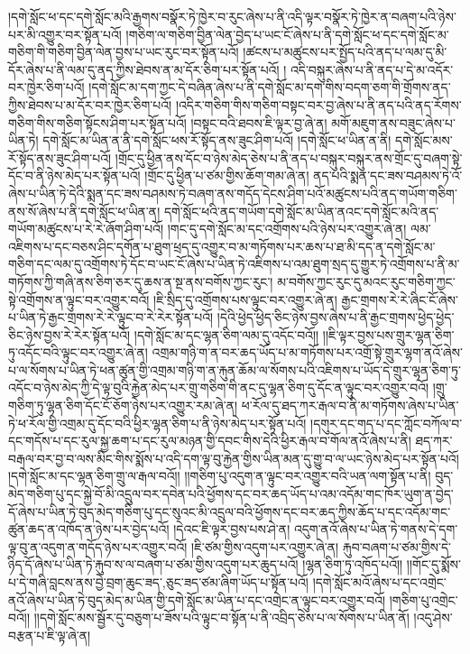 །དགེ་སློང་ཕ་དང་དགེ་སློང་མའི་རྒྱགས་བསྣོར་ཏེ་ཁྱེར་བ་རུང་ཞེས་པ་ནི་འདི་ལྟར་བསྣོར་ཏེ་ཁྱེར་ན་བཞག་པའི་ཉེས་པར་མི་འགྱུར་བར་སྟོན་པའོ། །གཅིག་ལ་གཅིག་བྱིན་ལེན་བྱེད་པ་ཡང་ངོ་ཞེས་པ་ནི་དགེ་སློང་ཕ་དང་དགེ་སློང་མ་གཅིག་གི་གཅིག་བྱིན་ལེན་བྱས་པ་ཡང་རུང་བར་སྟོན་པའོ། །ཚངས་པ་མཚུངས་པར་སྤྱོད་པའི་ནད་པ་ལམ་དུ་མི་དོར་ཞེས་པ་ནི་ལམ་དུ་ནད་ཀྱིས་ཐེབས་ན་མ་དོར་ཅིག་པར་སྟོན་པའོ། །
འདི་བསྐུར་ཞེས་པ་ནི་ནད་པ་དེ་མ་འདོར་བར་ཁྱེར་ཅིག་པའོ། །དགེ་སློང་མ་དག་ཀྱང་དེ་བཞིན་ཞེས་པ་ནི་དགེ་སློང་མ་དག་གིས་བདག་ཅག་གི་གྲོགས་ནད་ཀྱིས་ཐེབས་པ་མ་དོར་བར་ཁྱེར་ཅིག་པའོ། །འདིར་གཅིག་གིས་གཅིག་བསྟང་བར་བྱ་ཞེས་པ་ནི་ནད་པའི་ནད་རོགས་གཅིག་གིས་གཅིག་སྟོངས་ཤིག་པར་སྟོན་པའོ། །བསྟང་བའི་ཐབས་ཇི་ལྟར་བྱ་ཞེ་ན། མགོ་མཇུག་ནས་བཟུང་ཞེས་པ་ཡིན་ཏེ། དགེ་སློང་མ་ཡིན་ན་ནི་དགེ་སློང་ཕས་རོ་སྟོད་ནས་ཟུང་ཤིག་པའོ། །དགེ་སློང་ཕ་ཡིན་ན་ནི། དགེ་སློང་མས་རོ་སྟོད་ནས་ཟུང་ཤིག་པའོ། །གྲོང་དུ་ཕྱིན་ནས་དོང་བ་ཉེས་མེད་ཅེས་པ་ནི་ནད་པ་བསྐུར་བསྐུར་ནས་གྲོང་དུ་བཞག་སྟེ་དོང་བ་ནི་ཉེས་མེད་པར་སྟོན་པའོ། །གྲོང་དུ་ཕྱིན་པ་ཙམ་གྱིས་ཆོག་གམ་ཞེ་ན། ནད་པའི་སྨན་དང་ཟས་བཤམས་ཏེ་འོ་ཞེས་པ་ཡིན་ཏེ་དེའི་སྨན་དང་ཟས་བཤམས་ཏེ་བཞག་ནས་གདོད་དེངས་ཤིག་པའོ་མཚུངས་པའི་ནད་གཡོག་གཅིག་ནས་སོ་ཞེས་པ་ནི་དགེ་སློང་ཕ་ཡིན་ན། དགེ་སློང་ཕའི་ནད་གཡོག་དགེ་སློང་མ་ཡིན་ནའང་དགེ་སློང་མའི་ནད་གཡོག་མཚུངས་པ་རེ་རེ་ཞོག་ཤིག་པའོ། །གང་དུ་དགེ་སློང་མ་དང་འགྲོགས་པའི་ཉེས་པར་འགྱུར་ཞེ་ན། ལམ་འཇིགས་པ་དང་བཅས་ཤིང་དགོན་པ་ཐུག་ཕྲད་དུ་འགྱུར་བ་མ་གཏོགས་པར་ཆས་པ་ཐ་མི་དད་ན་དགེ་སློང་མ་གཅིག་དང་ལམ་དུ་འགྲོགས་ཏེ་དོང་བ་ཡང་ངོ་ཞེས་པ་ཡིན་ཏེ་འཇིགས་པ་འམ་ཐུག་སྲད་དུ་གྱུར་ཏེ་འགྲོགས་པ་ནི་མ་གཏོགས་ཀྱི་གཞི་ནས་ཅིག་ཅར་དུ་ཆས་ན་སྔ་ནས་བགོས་ཀྱང་རུང་། མ་བགོས་ཀྱང་རུང་དུ་མའང་རུང་གཅིག་ཀྱང་སྟེ་འགྲོགས་ན་ལྟུང་བར་འགྱུར་བའོ། །ཇི་སྲིད་དུ་འགྲོགས་པས་ལྟུང་བར་འགྱུར་ཞེ་ན། རྒྱང་གྲགས་རེ་རེ་ཞིང་ངོ་ཞེས་པ་ཡིན་ཏེ་རྒྱང་གྲགས་རེ་རེ་ལྟུང་བ་རེ་རེར་སྟོན་པའོ། །དེའི་ཕྱེད་ཕྱེད་ཅིང་ཉེས་བྱས་ཞེས་པ་ནི་རྒྱང་གྲགས་ཕྱེད་ཕྱེད་ཅིང་ཉེས་བྱས་རེ་རེར་སྟོན་པའོ། །དགེ་སློང་མ་དང་ལྷན་ཅིག་ལམ་དུ་འདོང་བའོ།། །།ཇི་ལྟར་བྱས་པས་གྲུར་ལྷན་ཅིག་ཏུ་འདོང་བའི་ལྟུང་བར་འགྱུར་ཞེ་ན། འགྲམ་གཉི་ག་ན་བར་ཆད་ཡོད་པ་མ་གཏོགས་པར་འགྲོ་སྟེ་གྲུར་ལྷག་ནའོ་ཞེས་པ་ལ་སོགས་པ་ཡིན་ཏེ་ཕན་ཚུན་གྱི་འགྲམ་གཉི་ག་ན་རྐུན་ཆོམ་ལ་སོགས་པའི་འཇིགས་པ་ཡོད་དེ་གྲུར་ལྷན་ཅིག་ཏུ་འདོང་བ་ཉེས་མེད་ཀྱི་དེ་ལྟ་བུའི་རྐྱེན་མེད་པར་གྲུ་གཅིག་གི་ནང་དུ་ལྷན་ཅིག་དུ་དོང་ན་ལྟུང་བར་འགྱུར་བའོ། །གྲུ་གཅིག་ཏུ་ལྷན་ཅིག་དོང་ངོ་ཅོག་ཉེས་པར་འགྱུར་རམ་ཞེ་ན། ཕ་རོལ་དུ་ཐད་ཀར་རྒལ་བ་ནི་མ་གཏོགས་ཞེས་པ་ཡིན་ཏེ་ཕ་རོལ་གྱི་འགྲམ་དུ་དོང་བའི་ཕྱིར་ལྷན་ཅིག་པ་ནི་ཉེས་མེད་པར་སྟོན་པའོ། །དགུར་དང་གད་པ་དང་ཀློང་བཀོལ་བ་དང་གདོས་པ་དང་རུལ་སྐྱ་ཆག་པ་དང་རུལ་མཉན་གྱི་དབང་གིས་དེའི་ཕྱིར་རྒལ་བ་གོལ་ནའོ་ཞེས་པ་ནི། ཐད་ཀར་བརྒལ་བར་བྱ་བ་ལས་མིང་གིས་སྨོས་པ་འདི་དག་ལྟ་བུ་རྐྱེན་གྱིས་ཡིན་མན་དུ་གྱུ་བ་ལ་ཡང་ཉེས་མེད་པར་སྟོན་པའོ། །དགེ་སློང་མ་དང་ལྷན་ཅིག་གྲུ་ལ་རྒལ་བའོ།། །།གཅིག་པུ་འདུག་ན་ལྟུང་བར་འགྱུར་བའི་ཡན་ལག་སྟོན་པ་ནི། བུད་མེད་གཅིག་པུ་དང་སྐྱེ་བོ་མི་འདྲུལ་བར་དབེན་པའི་ཕྱོགས་དང་བར་ཆད་ཡོད་པ་འམ་འདོམ་གང་ཁོར་ཡུག་ན་བྱེད་དོ་ཞེས་པ་ཡིན་ཏེ་བུད་མེད་གཅིག་པུ་དང་སུའང་མི་འདྲུལ་བའི་ཕྱོགས་དང་བར་ཆད་ཀྱིས་ཆོད་པ་དང་འདོམ་གང་ཚུན་ཆད་ན་འཁོད་ན་ཉེས་པར་བྱེད་པའོ། །དེའང་ཇི་ལྟར་བྱས་པས་ཤེ་ན། འདུག་ནའོ་ཞེས་པ་ཡིན་ཏེ་གནས་དེ་དག་ལྟ་བུ་ན་འདུག་ན་གདོད་ཉེས་པར་འགྱུར་བའོ། །ཇི་ཙམ་གྱིས་འདུག་པར་འགྱུར་ཞེ་ན། རྐུབ་བཞག་པ་ཙམ་གྱིས་དེ་ཉིད་དོ་ཞེས་པ་ཡིན་ཏེ་རྐུབ་ས་ལ་བཞག་པ་ཙམ་གྱིས་འདུག་པར་ཆུད་པའོ། །ལྷན་ཅིག་ཏུ་འཁོད་པའོ།། །།གོང་དུ་སྨོས་པ་དེ་གཞི་བླངས་ནས་བྱེ་བྲག་{ཆུང་ཟད་,ཅུང་ཟད་}ཙམ་ཞིག་ཡོད་པ་སྟོན་པའོ། །དགེ་སློང་མའོ་ཞེས་པ་དང་འགྲེང་ནའོ་ཞེས་པ་ཡིན་ཏེ་བུད་མེད་མ་ཡིན་གྱི་དགེ་སློང་མ་ཡིན་པ་དང་འགྲེང་ན་ལྟུང་བར་འགྱུར་བའོ། །གཅིག་པུ་འགྲེང་བའོ།། །།དགེ་སློང་མས་སྦྱོར་དུ་བཅུག་པ་ཟོས་པའི་ལྟུང་བ་སྟོན་པ་ནི་འབྲིད་ཅེས་པ་ལ་སོགས་པ་ཡིན་ནོ། །འདུ་ཤེས་བརྩན་པ་ཇི་ལྟ་ཞེ་ན། 